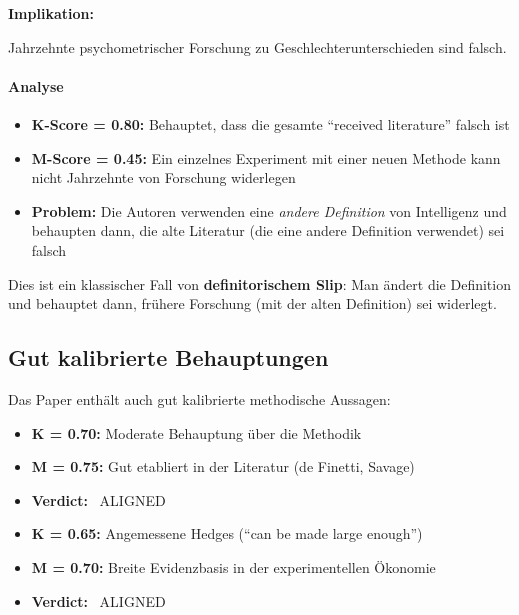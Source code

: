\begin{tcolorbox}[colback=red!5!white,colframe=red!50!black,title=Severe Overclaim]
\textbf{Implikation:}

Jahrzehnte psychometrischer Forschung zu Geschlechterunterschieden sind falsch.
\end{tcolorbox}

\paragraph{Analyse}
\begin{itemize}
    \item \textbf{K-Score = 0.80:} Behauptet, dass die gesamte ``received literature'' falsch ist
    \item \textbf{M-Score = 0.45:} Ein einzelnes Experiment mit einer neuen Methode kann nicht Jahrzehnte von Forschung widerlegen
    \item \textbf{Problem:} Die Autoren verwenden eine \emph{andere Definition} von Intelligenz und behaupten dann, die alte Literatur (die eine andere Definition verwendet) sei falsch
\end{itemize}

Dies ist ein klassischer Fall von \textbf{definitorischem Slip}: Man \"andert die Definition und behauptet dann, fr\"uhere Forschung (mit der alten Definition) sei widerlegt.


\subsection{Gut kalibrierte Behauptungen}

Das Paper enth\"alt auch gut kalibrierte methodische Aussagen:

\begin{tcolorbox}[colback=green!5!white,colframe=green!50!black,title=QSR elicits subjective belief distributions ($\Delta = -0.05$)]
\begin{itemize}
    \item \textbf{K = 0.70:} Moderate Behauptung \"uber die Methodik
    \item \textbf{M = 0.75:} Gut etabliert in der Literatur (de Finetti, Savage)
    \item \textbf{Verdict:} \checkmark\ ALIGNED
\end{itemize}
\end{tcolorbox}

\begin{tcolorbox}[colback=green!5!white,colframe=green!50!black,title=Financial incentives affect performance ($\Delta = -0.05$)]
\begin{itemize}
    \item \textbf{K = 0.65:} Angemessene Hedges (``can be made large enough'')
    \item \textbf{M = 0.70:} Breite Evidenzbasis in der experimentellen \"Okonomie
    \item \textbf{Verdict:} \checkmark\ ALIGNED
\end{itemize}
\end{tcolorbox}


